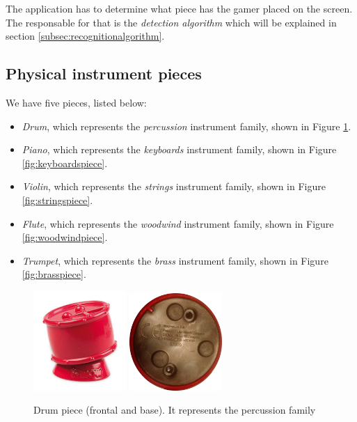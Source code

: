 The application has to determine what piece has the gamer placed on the screen. The responsable for that is the \textit{detection algorithm} which will be explained in section \ref{subsec:recognitionalgorithm}.

\subsection{Physical instrument pieces}
\label{sec:piecesdetailed}
We have five pieces, listed below:
\begin{itemize}
\item \textit{Drum}, which represents the \textit{percussion} instrument family, shown in Figure \ref{fig:percussionpiece}.
\item \textit{Piano}, which represents the \textit{keyboards} instrument family, shown in Figure \ref{fig:keyboardspiece}.
\item \textit{Violin}, which represents the \textit{strings} instrument family, shown in Figure \ref{fig:stringspiece}.
\item \textit{Flute}, which represents the \textit{woodwind} instrument family, shown in Figure \ref{fig:woodwindpiece}.
\item \textit{Trumpet}, which represents the \textit{brass} instrument family, shown in Figure \ref{fig:brasspiece}.
\end{itemize}

\begin{figure}[ht!]
	\centering
	\includegraphics[width=100pt]{graphics/architecture/pieces/piecePercussion.jpg}
	\vspace{0.6cm}
	\includegraphics[width=100pt]{graphics/architecture/pieces/percussionBase.png}
	\caption{Drum piece (frontal and base). It represents the percussion family}
	\label{fig:percussionpiece}
\end{figure}

